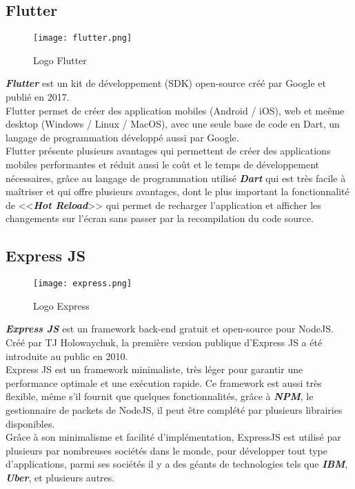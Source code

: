 \subsection{Flutter}
\vspace{1cm}
\begin{figure}[H]
    \centering
    \texttt{[image: flutter.png]}
    \vspace{1cm}
    \captionsetup{justification=centering}

    \caption{Logo Flutter}
    \label{fig:flutter_logo}
\end{figure}
\textit{\textbf{Flutter}} \cite{flutter} est un kit de développement (SDK) open-source créé par Google et publié en 2017.\\
\noindent Flutter permet de créer des application mobiles (Android / iOS), web et meême desktop (Windows / Linux / MacOS), avec une seule base de code en Dart, un langage de programmation développé aussi par Google. \\
\noindent Flutter présente plusieurs avantages qui permettent de créer des applications mobiles performantes et réduit aussi le coût et le temps de développement nécessaires, grâce au langage de programmation utilisé \textit{\textbf{Dart}} qui est très facile à maîtriser et qui offre plusieurs avantages, dont le plus important la fonctionnalité de <<\textit{\textbf{Hot Reload}}>> qui permet de recharger l'application et afficher les changements sur l'écran sans passer par la recompilation du code source.
\subsection{Express JS}
\vspace{1cm}
\begin{figure}[H]
    \centering
    \texttt{[image: express.png]}
    \vspace{1cm}
    \captionsetup{justification=centering}
    \caption{Logo Express}
    \label{fig:express_logo}
\end{figure}
\textit{\textbf{Express JS}} \cite{expressjs} est un framework back-end gratuit et open-source pour NodeJS. Créé par TJ Holowaychuk, la première version publique d'Express JS a été introduite au public en 2010.\\
Express JS est un framework minimaliste, très léger pour garantir une performance optimale et une exécution rapide. Ce framework est aussi très flexible, même s'il fournit que quelques fonctionnalités, grâce à \textit{\textbf{NPM}}, le gestionnaire de packets de NodeJS, il peut être complété par plusieurs librairies disponibles.\\
\noindent Grâce à son minimalisme et facilité d'implémentation, ExpressJS est utilisé par plusieurs par nombreuses sociétés dans le monde, pour développer tout type d'applications, parmi ses sociétés il y a des géants de technologies tels que \textit{\textbf{IBM}}, \textit{\textbf{Uber}}, et plusieurs autres.
